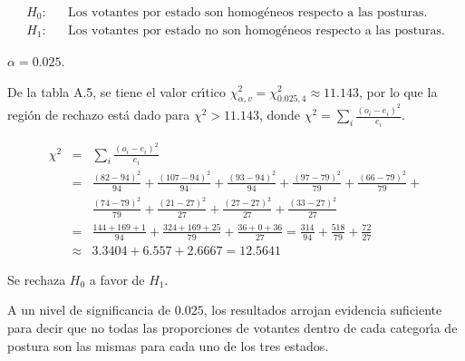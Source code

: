 \begin{solucion}
 \begin{hipotesis}
  \begin{eqnarray*}
   H_0: & & \text{Los votantes por estado son homog\'eneos respecto a las posturas.} \\
   H_1: & & \text{Los votantes por estado no son homog\'eneos respecto a las posturas.}
  \end{eqnarray*}
 \end{hipotesis}

 \begin{significancia}
  $\alpha = 0.025$.
 \end{significancia}

 \begin{region}
  De la tabla A.5, se tiene el valor cr\'{\i}tico
  $\chi^2_{\alpha,v} = \chi^2_{0.025,4} \approx 11.143$,
  por lo que la regi\'on de rechazo est\'a dado
  para $\chi^2 > 11.143$, donde
  $\chi^2 = \sum_{i} \frac{\left( o_i - e_i \right)^2}{e_i}$.
 \end{region}

 \begin{estadistico}
  \begin{eqnarray*}
   \chi^2 & = & \sum_{i} \frac{\left( o_i - e_i \right)^2}{e_i} \\
   & = & \frac{(82 - 94)^2}{94} + \frac{(107 - 94)^2}{94} +
   \frac{(93 - 94)^2}{94} + \frac{(97 - 79)^2}{79} + 
   \frac{(66 - 79)^2}{79} + \\
   & & \frac{(74 - 79)^2}{79} + \frac{(21 - 27)^2}{27} +
   \frac{(27 - 27)^2}{27} + \frac{(33 - 27)^2}{27} \\
   & = & \frac{144 + 169 + 1}{94} + \frac{324 + 169 + 25}{79} + 
   \frac{36 + 0 + 36}{27}
   = \frac{314}{94} + \frac{518}{79} + \frac{72}{27} \\
   & \approx & 3.3404 + 6.557 + 2.6667 = 12.5641
  \end{eqnarray*}
 \end{estadistico}

 \begin{decision}
  Se rechaza $H_0$ a favor de $H_1$.
 \end{decision}

 \begin{conclusion}
  A un nivel de significancia de $0.025$, los resultados arrojan
  evidencia suficiente para decir que no todas
  las proporciones de votantes dentro de cada categor\'{\i}a
  de postura son las mismas para cada uno de los tres estados.
 \end{conclusion}


\end{solucion}
